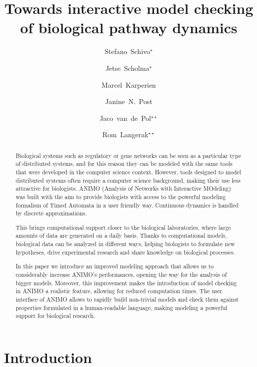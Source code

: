 \documentclass{llncs}
\title{Towards interactive model checking\\of biological pathway dynamics}
\author{Stefano~Schivo${}^\star$
\and Jetse~Scholma${}^\star$
\and Marcel~Karperien
\and Janine~N.~Post
\and Jaco~van~de~Pol${}^{\star \star}$
\and Rom~Langerak${}^{\star \star}$}
\institute{University of Twente, Enschede, The Netherlands}
\date{}
\begin{document}
\maketitle

\let\oldthefootnote\thefootnote
\renewcommand{\thefootnote}{\fnsymbol{footnote}}
\let\thefootnote\oldthefootnote



\begin{abstract}

Biological systems such as regulatory or gene networks can be
seen as a particular type of distributed systems, and for this reason
they can be modeled with the same tools that were developed in the
computer science context. However, tools designed to model distributed
systems often require a computer science background, making their use
less attractive for biologists. ANIMO (Analysis of Networks with
Interactive MOdeling) was built with the aim to provide biologists
with access to the powerful modeling formalism of Timed Automata
in a user friendly way. Continuous dynamics is handled by discrete approximations.

This brings computational support closer to the biological laboratories, 
where large amounts of data are generated on a daily basis. Thanks to 
computational models, biological data can be analyzed in different ways, 
helping biologists to formulate new hypotheses, drive experimental research 
and share knowledge on biological processes.

In this paper we introduce an improved modeling approach that allows us
to considerably increase ANIMO's performances, opening the way for the
analysis of bigger models. Moreover, this improvement makes the introduction
of model checking in ANIMO a realistic feature, allowing for
reduced computation times. The user interface of ANIMO allows to rapidly
build non-trivial models and check them against properties formulated in
a human-readable language, making modeling a powerful
support for biological research.

\end{abstract}

\section{Introduction}\label{sec:introduction}
\end{document}
